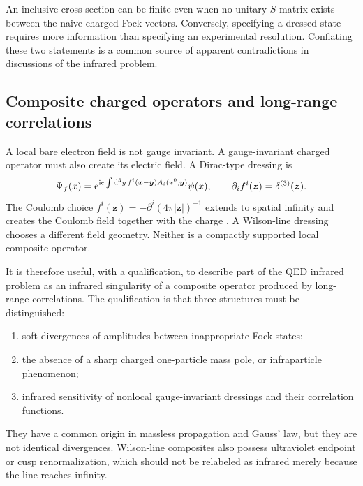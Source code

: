 An inclusive cross section can be finite even when no unitary $S$ matrix
exists between the naive charged Fock vectors.  Conversely, specifying a
dressed state requires more information than specifying an experimental
resolution.  Conflating these two statements is a common source of apparent
contradictions in discussions of the infrared problem.

\subsection{Composite charged operators and long-range correlations}
\label{subsec:composite-infrared}

A local bare electron field is not gauge invariant.  A gauge-invariant charged
operator must also create its electric field.  A Dirac-type dressing is
\begin{equation}
  \Psi_f(x)
  =
  \mathrm{e}^{
  \mathrm{i} e\int\mathrm{d}^3y\,
  f^i(\bm x-\bm y)A_i(x^0,\bm y)
  }\psi(x),
  \qquad
  \partial_i f^i(\bm z)=\delta^{(3)}(\bm z).
  \label{eq:dirac-dressed-field}
\end{equation}
The Coulomb choice
$f^i(\bm z)=-\partial^i(4\pi|\bm z|)^{-1}$ extends to spatial infinity and
creates the Coulomb field together with the charge
\cite{Dirac:1955GaugeInvariant}.  A Wilson-line dressing chooses a different
field geometry.  Neither is a compactly supported local composite operator.

It is therefore useful, with a qualification, to describe part of the QED
infrared problem as an infrared singularity of a composite operator produced
by long-range correlations.  The qualification is that three structures must
be distinguished:
\begin{enumerate}
  \item soft divergences of amplitudes between inappropriate Fock states;
  \item the absence of a sharp charged one-particle mass pole, or
  infraparticle phenomenon;
  \item infrared sensitivity of nonlocal gauge-invariant dressings and their
  correlation functions.
\end{enumerate}
They have a common origin in massless propagation and Gauss' law, but they are
not identical divergences.  Wilson-line composites also possess ultraviolet
endpoint or cusp renormalization, which should not be relabeled as infrared
merely because the line reaches infinity.

